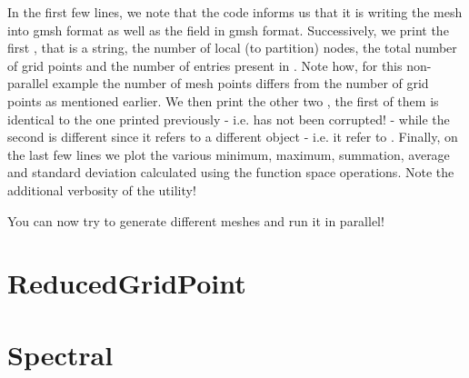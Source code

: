 %
In the first few lines, we note that the code informs us that it is 
writing the mesh into gmsh format as well as the field in gmsh format.
Successively, we print the first , that is a string, 
the number of local (to partition) nodes, the total number of grid 
points and the number of entries present in . 
Note how, for this non-parallel example the number of mesh points 
differs from the number of grid points as mentioned earlier. We 
then print the other two , the first of them is 
identical to the one printed previously - i.e.  
has not been corrupted! - while the second is different since it 
refers to a different object - i.e. it refer to .
Finally, on the last few lines we plot the various minimum, maximum, 
summation, average and standard deviation calculated using the 
function space operations.
Note the additional verbosity of the  \Atlas utility!

You can now try to generate different meshes and run it in parallel!


\section{ReducedGridPoint}
\section{Spectral}

